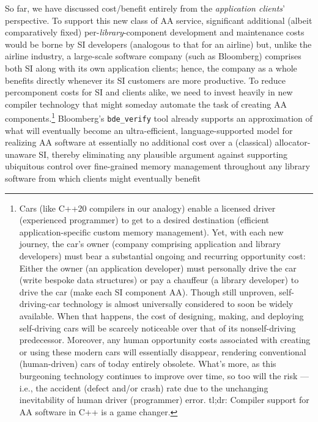 So far, we have discussed cost/benefit entirely from the \emph{application clients}’
perspective. To support this new class of AA service, significant additional (albeit
comparatively fixed) per-\emph{library}-component development and maintenance costs
would be borne by SI developers (analogous to that for an airline) but, unlike the
airline industry, a large-scale software company (such as Bloomberg) comprises
both SI along with its own application clients; hence, the company as a whole
benefits directly whenever its SI customers are more productive. To reduce percomponent costs for SI and clients alike, we need to invest heavily in new compiler
technology that might someday automate the task of creating AA components.\footnote{Cars (like C++20 compilers in our analogy) enable a licensed driver (experienced programmer) to
get to a desired destination (efficient application-specific custom memory management). Yet, with
each new journey, the car’s owner (company comprising application and library developers) must
bear a substantial ongoing and recurring opportunity cost: Either the owner (an application
developer) must personally drive the car (write bespoke data structures) or pay a chauffeur (a library
developer) to drive the car (make each SI component AA). Though still unproven, self-driving-car
technology is almost universally considered to soon be widely available. When that happens, the cost
of designing, making, and deploying self-driving cars will be scarcely noticeable over that of its
nonself-driving predecessor. Moreover, any human opportunity costs associated with creating or using
these modern cars will essentially disappear, rendering conventional (human-driven) cars of today
entirely obsolete. What's more, as this burgeoning technology continues to improve over time, so too
will the risk — i.e., the accident (defect and/or crash) rate due to the unchanging inevitability of
human driver (programmer) error. tl;dr: Compiler support for AA software in C++ is a game changer.}
Bloomberg’s \lstinline{bde_verify} tool already supports an approximation of what will
eventually become an ultra-efficient, language-supported model for realizing AA
software at essentially no additional cost over a (classical) allocator-unaware SI,
thereby eliminating any plausible argument against supporting ubiquitous control
over fine-grained memory management throughout any library software from which
clients might eventually benefit
